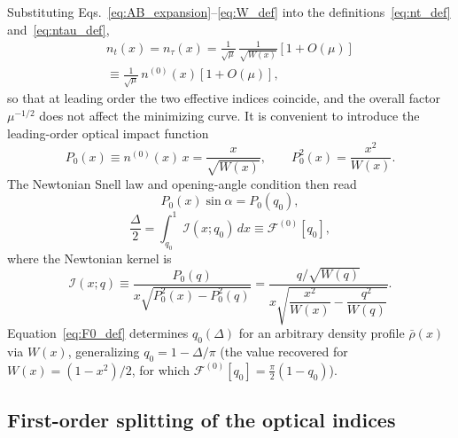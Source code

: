 \documentclass[
  aps,
  prd,
  twocolumn,
  nofootinbib,
  superscriptaddress,
  longbibliography
]{revtex4-2}
\begin{document}
Substituting Eqs.~\eqref{eq:AB_expansion}--\eqref{eq:W_def} into the
definitions~\eqref{eq:nt_def} and~\eqref{eq:ntau_def},
\begin{multline}
n_t(x)=n_\tau(x)
=
\frac{1}{\sqrt{\mu}}\,\frac{1}{\sqrt{W(x)}}
\left[1+O(\mu)\right]
\\
\equiv
\frac{1}{\sqrt{\mu}}\,n^{(0)}(x)\left[1+O(\mu)\right],
\label{eq:n0_def}
\end{multline}
so that at leading order the two effective indices coincide, and the
overall factor $\mu^{-1/2}$ does not affect the minimizing curve. It is
convenient to introduce the leading-order optical impact function
\begin{equation}
P_0(x)\equiv n^{(0)}(x)\,x=\frac{x}{\sqrt{W(x)}},
\qquad
P_0^2(x)=\frac{x^2}{W(x)}.
\label{eq:P0_def}
\end{equation}
The Newtonian Snell law and opening-angle condition then read
\begin{equation}
P_0(x)\sin\alpha=P_0(q_0),
\label{eq:snell0}
\end{equation}
\begin{equation}
\frac{\Delta}{2}
=
\int_{q_0}^1
\mathcal{I}(x;q_0)\,dx
\equiv
\mathcal{F}^{(0)}[q_0],
\label{eq:F0_def}
\end{equation}
where the Newtonian kernel is
\begin{equation}
\mathcal{I}(x;q)
\equiv
\frac{P_0(q)}
{x\sqrt{P_0^2(x)-P_0^2(q)}}
=
\frac{q/\sqrt{W(q)}}
{x\sqrt{\dfrac{x^2}{W(x)}-\dfrac{q^2}{W(q)}}}.
\label{eq:kernel_def}
\end{equation}
Equation~\eqref{eq:F0_def} determines $q_0(\Delta)$ for an arbitrary
density profile $\bar\rho(x)$ via $W(x)$, generalizing
$q_0=1-\Delta/\pi$ (the value recovered for $W(x)=(1-x^2)/2$, for which
$\mathcal{F}^{(0)}[q_0]=\tfrac{\pi}{2}(1-q_0)$).

\subsection{First-order splitting of the optical indices}
\end{document}
